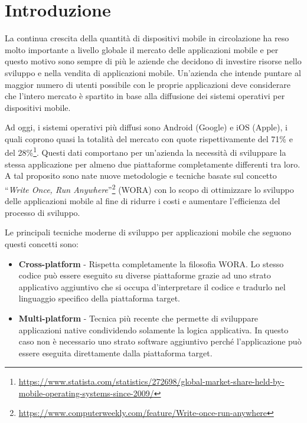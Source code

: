
\section{Introduzione}
La continua crescita della quantità di dispositivi mobile in circolazione ha reso molto importante a livello globale il mercato delle applicazioni mobile e per questo motivo sono sempre di più le aziende che decidono di investire risorse nello sviluppo e nella vendita di applicazioni mobile. 
Un'azienda che intende puntare al maggior numero di utenti possibile con le proprie applicazioni deve considerare che l'intero mercato è spartito in base alla diffusione dei sistemi operativi per dispositivi mobile. 

Ad oggi, 
i sistemi operativi più diffusi sono Android (Google) e iOS (Apple), 
i quali coprono quasi la totalità del mercato con quote rispettivamente del 71\% e del 28\%\footnote{\href{https://www.statista.com/statistics/272698/global-market-share-held-by-mobile-operating-systems-since-2009/}{https://www.statista.com/statistics/272698/global-market-share-held-by-mobile-operating-systems-since-2009/}}.
Questi dati comportano per un'azienda la necessità di sviluppare la stessa applicazione per almeno due piattaforme completamente differenti tra loro. 
A tal proposito sono nate nuove metodologie e tecniche basate sul concetto ``\textit{Write Once, Run Anywhere}''\footnote{\href{https://www.computerweekly.com/feature/Write-once-run-anywhere}{https://www.computerweekly.com/feature/Write-once-run-anywhere}} (WORA) con lo scopo di ottimizzare lo sviluppo delle applicazioni mobile al fine di ridurre i costi e aumentare l'efficienza del processo di sviluppo.

Le principali tecniche moderne di sviluppo per applicazioni mobile che seguono questi concetti sono:
\begin{itemize}
    \item \textbf{Cross-platform} - Rispetta completamente la filosofia WORA. Lo stesso codice può essere eseguito su diverse piattaforme grazie ad uno strato applicativo aggiuntivo che si occupa d'interpretare il codice e tradurlo nel linguaggio specifico della piattaforma target.
    
    \item \textbf{Multi-platform} - Tecnica più recente che permette di sviluppare applicazioni native condividendo solamente la logica applicativa. In questo caso non è necessario uno strato software aggiuntivo perché l'applicazione può essere eseguita direttamente dalla piattaforma target.
\end{itemize}

